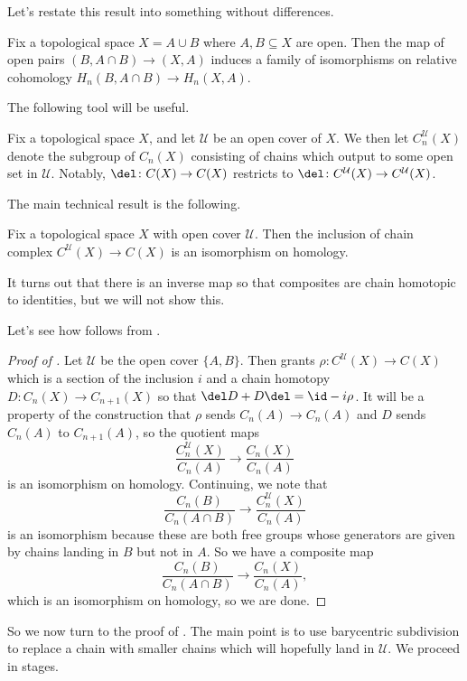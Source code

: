 \documentclass[../notes.tex]{subfiles}
\begin{document}
Let's restate this result into something without differences.
\begin{theorem}[excision] \label{thm:ex}
	Fix a topological space $X=A\cup B$ where $A,B\subseteq X$ are open. Then the map of open pairs $(B,A\cap B)\to(X,A)$ induces a family of isomorphisms on relative cohomology $H_n(B,A\cap B)\to H_n(X,A)$.
\end{theorem}
The following tool will be useful.
\begin{definition}
	Fix a topological space $X$, and let $\mathcal U$ be an open cover of $X$. We then let $C_n^{\mathcal U}(X)$ denote the subgroup of $C_n(X)$ consisting of chains which output to some open set in $\mathcal U$. Notably, $\del\colon C(X)\to C(X)$ restricts to $\del\colon C^{\mathcal U}(X)\to C^{\mathcal U}(X)$.
\end{definition}
The main technical result is the following.
\begin{proposition} \label{prop:homology-is-local}
	Fix a topological space $X$ with open cover $\mathcal U$. Then the inclusion of chain complex $C^{\mathcal U}(X)\to C(X)$ is an isomorphism on homology.
\end{proposition}
\begin{remark}
	It turns out that there is an inverse map so that composites are chain homotopic to identities, but we will not show this.
\end{remark}
Let's see how  follows from .
\begin{proof}[Proof of ]
	Let $\mathcal U$ be the open cover $\{A,B\}$. Then  grants $\rho\colon C^{\mathcal U}(X)\to C(X)$ which is a section of the inclusion $i$ and a chain homotopy $D\colon C_n(X)\to C_{n+1}(X)$ so that $\del D+D\del={\id}-i\rho$. It will be a property of the construction that $\rho$ sends $C_n(A)\to C_n(A)$ and $D$ sends $C_n(A)$ to $C_{n+1}(A)$, so the quotient maps
	\[\frac{C_n^{\mathcal U}(X)}{C_n(A)}\to\frac{C_n(X)}{C_n(A)}\]
	is an isomorphism on homology. Continuing, we note that
	\[\frac{C_n(B)}{C_n(A\cap B)}\to\frac{C_n^{\mathcal U}(X)}{C_n(A)}\]
	is an isomorphism because these are both free groups whose generators are given by chains landing in $B$ but not in $A$. So we have a composite map
	\[\frac{C_n(B)}{C_n(A\cap B)}\to\frac{C_n(X)}{C_n(A)},\]
	which is an isomorphism on homology, so we are done.
\end{proof}
So we now turn to the proof of . The main point is to use barycentric subdivision to replace a chain with smaller chains which will hopefully land in $\mathcal U$. We proceed in stages.
\end{document}
